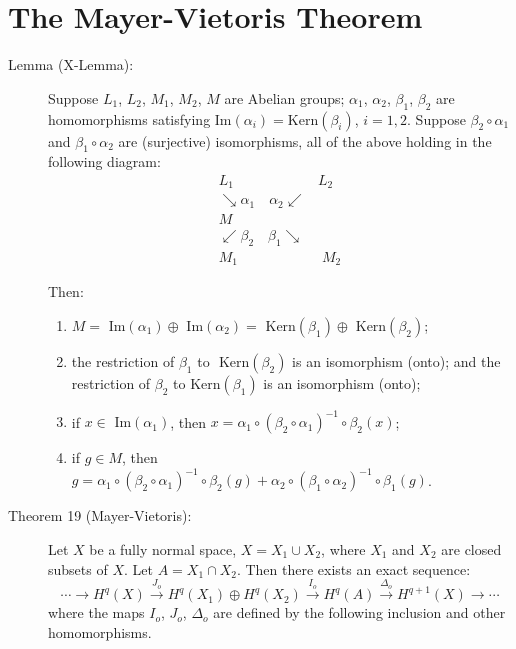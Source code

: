 \documentclass{article}
\begin{document}
\section{The Mayer-Vietoris Theorem}

\begin{description}

\item[Lemma (X-Lemma):] Suppose $L_1$, $L_2$, $M_1$, $M_2$, $M$ are Abelian groups; $\alpha_1$, $\alpha_2$, $\beta_1$, $\beta_2$ are homomorphisms satisfying $\text{Im}(\alpha_i) = \text{Kern}(\beta_i)$, $i=1,2$. Suppose $\beta_2 \circ \alpha_1$ and $\beta_1 \circ \alpha_2$ are (surjective) isomorphisms, all of the above holding in the following diagram:
  \begin{gather*}
  L_1 \quad\quad\quad\quad\quad\quad L_2 \\
  \searrow \alpha_1 \quad \alpha_2 \swarrow \\
  M \\
  \swarrow \beta_2 \quad \beta_1 \searrow \\
  M_1 \quad\quad\quad\quad\quad\quad M_2
  \end{gather*}

  Then:
  \begin{enumerate}[\hspace{1cm}(1)]
    \item $M = \text{ Im}(\alpha_1) \oplus \text{ Im}(\alpha_2) = \text{ Kern}(\beta_1) \oplus \text{ Kern}(\beta_2)$;
    \item the restriction of $\beta_1$ to $\text{ Kern}(\beta_2)$ is an isomorphism (onto); and the restriction of $\beta_2$ to $\text{Kern}(\beta_1)$ is an isomorphism (onto);
    \item if $x \in \text{ Im}(\alpha_1)$, then $x = \alpha_1 \circ (\beta_2 \circ \alpha_1)^{-1} \circ \beta_2(x)$;
    \item if $g \in M$, then $g = \alpha_1 \circ (\beta_2 \circ \alpha_1)^{-1} \circ \beta_2(g) + \alpha_2 \circ (\beta_1 \circ \alpha_2)^{-1} \circ \beta_1(g)$.
  \end{enumerate}

\item[Theorem 19 (Mayer-Vietoris):] Let $X$ be a fully normal space, $X = X_1 \cup X_2$, where $X_1$ and $X_2$ are closed subsets of $X$. Let $A = X_1 \cap X_2$. Then there exists an exact sequence:
  \begin{equation*}
  \cdots \longrightarrow H^q(X) \xrightarrow{\ J_o \ } H^q(X_1) \oplus H^q(X_2) \xrightarrow{\ I_o \ } H^q(A) \xrightarrow{\Delta_o} H^{q+1}(X) \longrightarrow \cdots
  \end{equation*}
  where the maps $I_o$, $J_o$, $\Delta_o$ are defined by the following inclusion and other homomorphisms.

\end{description}
\end{document}
